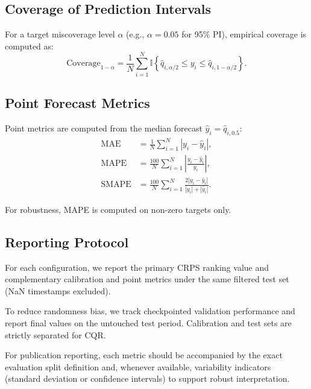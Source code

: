 \subsection{Coverage of Prediction Intervals}
\label{subsec:coverage_formal}

For a target miscoverage level $\alpha$ (e.g., $\alpha=0.05$ for 95\% PI),
empirical coverage is computed as:
\begin{equation}
\mathrm{Coverage}_{1-\alpha}=\frac{1}{N}\sum_{i=1}^{N}
\mathbb{I}\left\{\hat{q}_{i,\alpha/2}\le y_i\le \hat{q}_{i,1-\alpha/2}\right\}.
\label{eq:coverage_formal}
\end{equation}

\subsection{Point Forecast Metrics}
\label{subsec:point_metrics_formal}

Point metrics are computed from the median forecast
$\hat{y}_i=\hat{q}_{i,0.5}$:
\begin{align}
\mathrm{MAE} &= \frac{1}{N}\sum_{i=1}^{N}|y_i-\hat{y}_i|, \label{eq:mae_formal} \\
\mathrm{MAPE} &= \frac{100}{N}\sum_{i=1}^{N}\left|\frac{y_i-\hat{y}_i}{y_i}\right|, \label{eq:mape_formal} \\
\mathrm{SMAPE} &= \frac{100}{N}\sum_{i=1}^{N}
\frac{2|y_i-\hat{y}_i|}{|y_i|+|\hat{y}_i|}. \label{eq:smape_formal}
\end{align}

For robustness, MAPE is computed on non-zero targets only.

\subsection{Reporting Protocol}
\label{subsec:reporting_protocol}

For each configuration, we report the primary CRPS ranking value and
complementary calibration and point metrics under the same filtered test set
(NaN timestamps excluded).

To reduce randomness bias, we track checkpointed validation performance and
report final values on the untouched test period. Calibration and test sets
are strictly separated for CQR.

For publication reporting, each metric should be accompanied by the exact
evaluation split definition and, whenever available, variability indicators
(standard deviation or confidence intervals) to support robust interpretation.

